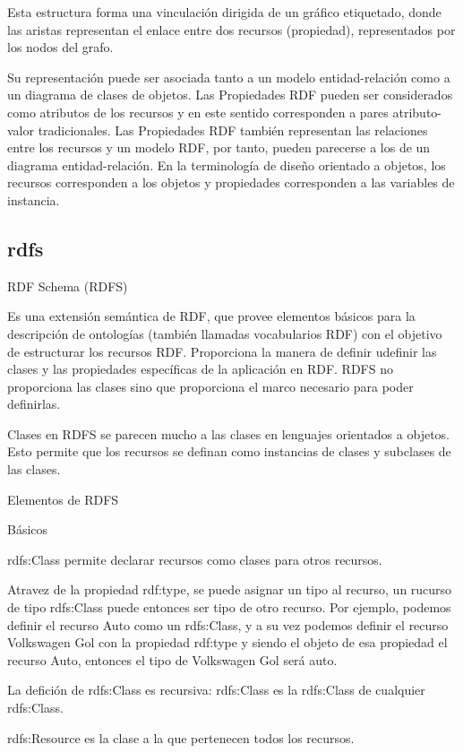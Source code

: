 Esta estructura forma una vinculación dirigida de un gráfico etiquetado, donde las aristas representan el enlace entre dos 
recursos (propiedad), representados por los nodos del grafo.

Su representación puede ser asociada tanto a un modelo entidad-relación como a un diagrama de clases de objetos.
Las Propiedades RDF pueden ser considerados como atributos de los recursos y en este sentido corresponden a pares 
atributo-valor tradicionales. Las Propiedades RDF también representan las relaciones entre los recursos y un modelo RDF,
por tanto, pueden parecerse a los de un diagrama entidad-relación.
En la terminología de diseño orientado a objetos, los recursos corresponden a los objetos y propiedades 
corresponden a las variables de instancia.

\subsection{rdfs}
RDF Schema (RDFS)

Es una extensión semántica de RDF, que provee elementos básicos para la descripción de ontologías (también llamadas vocabularios RDF) con el objetivo
de estructurar los recursos RDF. Proporciona la manera de definir udefinir las clases y las propiedades específicas de la aplicación en RDF.
RDFS no proporciona las clases sino que proporciona el marco necesario para poder definirlas.

Clases en RDFS se parecen mucho a las clases en lenguajes orientados a objetos. Esto permite que los recursos se definan como 
instancias de clases y subclases de las clases.

Elementos de RDFS

Básicos

    rdfs:Class permite declarar recursos como clases para otros recursos. 
    
    Atravez de la propiedad rdf:type, se puede asignar un tipo al recurso, un rucurso de tipo rdfs:Class puede entonces ser tipo de otro recurso. 
    Por ejemplo, podemos definir el recurso Auto como un rdfs:Class, y a su vez podemos definir el recurso Volkswagen Gol con la propiedad rdf:type 
    y siendo el objeto de esa propiedad el recurso Auto, entonces el tipo de Volkswagen Gol será auto.
    
    La defición de rdfs:Class es recursiva: rdfs:Class es la rdfs:Class de cualquier rdfs:Class.

    rdfs:Resource es la clase a la que pertenecen todos los recursos.

